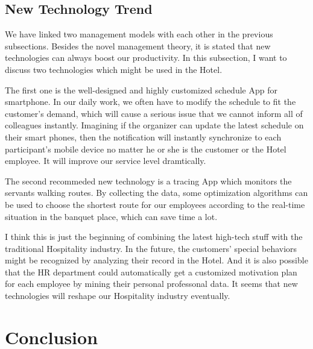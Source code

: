 \documentclass[12pt,onecolumn,a4paper]{IEEEtran}
\begin{document}
\subsection{\textbf{New Technology Trend}}
We have linked two management models with each other in the previous subsections. Besides the novel management theory, it is stated that new technologies can always boost our productivity. In this subsection, I want to discuss two technologies which might be used in the Hotel. 

The first one is the well-designed and highly customized schedule App for smartphone. In our daily work, we often have to modify the schedule to fit the customer's demand, which will cause a serious issue that we cannot inform all of colleagues instantly. Imagining if the organizer can update the latest schedule on their smart phones, then the notification will instantly synchronize to each participant's mobile device no matter he or she is the customer or the Hotel employee. It will improve our service level dramtically.

The second recommeded new technology is a tracing App which monitors the servants walking routes. By collecting the data, some optimization algorithms can be used to choose the shortest route for our employees according to the real-time situation in the banquet place, which can save time a lot.

I think this is just the beginning of combining the latest high-tech stuff with the traditional Hospitality industry. In the future, the customers' special behaviors might be recognized by analyzing their record in the Hotel. And it is also possible that the HR department could automatically get a customized motivation plan for each employee by mining their personal professonal data. It seems that new technologies will reshape our Hospitality industry eventually. 
\newpaget
\section{\textbf{Conclusion}}


\newpage


\renewcommand\refname{Reference}
\small


\end{document}
